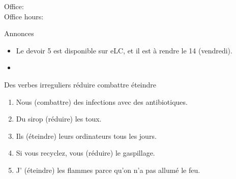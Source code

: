 \documentclass{beamer}
\subtitle[Environnement, verbes et subjonctif]{L'environnement, de nouveaux verbes et... plus de subjonctif!}
\begin{document}
  \begin{frame}
    \titlepage
    \tiny{Office: \\
          Office hours: }
  \end{frame}

  \begin{frame}{Annonces}
    \begin{itemize}
      \item Le devoir 5 est disponible sur eLC, et il est à rendre le 14 (vendredi).
      \item[] 
    \end{itemize}
  \end{frame}

  \begin{frame}{Des verbes irreguliers}
    réduire combattre éteindre
    \begin{enumerate}
      \item Nous \underline{} (combattre) des infections avec des antibiotiques.
      \item Du sirop \underline{} (réduire) les toux.
      \item Ils \underline{} (éteindre) leurs ordinateurs tous les jours.
      \item Si vous recyclez, vous \underline{} (réduire) le gaspillage.
      \item J'\underline{} (éteindre) les flammes parce qu'on n'a pas allumé le feu.
    \end{enumerate}
  \end{frame}
\end{document}
